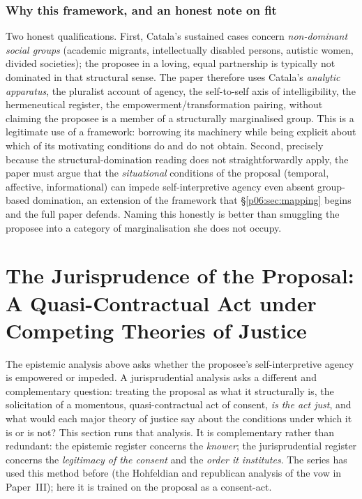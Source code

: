 \subsubsection{Why this framework, and an honest note on fit}

Two honest qualifications. First, Catala's sustained cases concern \emph{non-dominant social groups} (academic migrants, intellectually disabled persons, autistic women, divided societies); the proposee in a loving, equal partnership is typically not dominated in that structural sense. The paper therefore uses Catala's \emph{analytic apparatus}, the pluralist account of agency, the self-to-self axis of intelligibility, the hermeneutical register, the empowerment/transformation pairing, without claiming the proposee is a member of a structurally marginalised group. This is a legitimate use of a framework: borrowing its machinery while being explicit about which of its motivating conditions do and do not obtain. Second, precisely because the structural-domination reading does not straightforwardly apply, the paper must argue that the \emph{situational} conditions of the proposal (temporal, affective, informational) can impede self-interpretive agency even absent group-based domination, an extension of the framework that §\ref{p06:sec:mapping} begins and the full paper defends. Naming this honestly is better than smuggling the proposee into a category of marginalisation she does not occupy.

\section{The Jurisprudence of the Proposal: A Quasi-Contractual Act under Competing Theories of Justice}\label{p06:sec:jurisprudence}

The epistemic analysis above asks whether the proposee's self-interpretive agency is empowered or impeded. A jurisprudential analysis asks a different and complementary question: treating the proposal as what it structurally is, the solicitation of a momentous, quasi-contractual act of consent, \emph{is the act just}, and what would each major theory of justice say about the conditions under which it is or is not? This section runs that analysis. It is complementary rather than redundant: the epistemic register concerns the \emph{knower}; the jurisprudential register concerns the \emph{legitimacy of the consent} and the \emph{order it institutes}. The series has used this method before (the Hohfeldian and republican analysis of the vow in Paper~III); here it is trained on the proposal as a consent-act.

